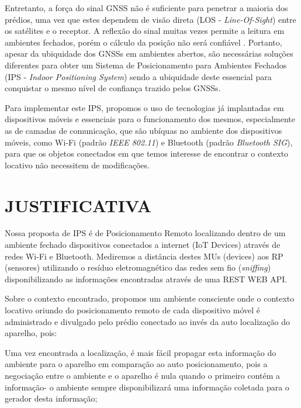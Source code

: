 \documentclass[
	12pt,				%
	openright,			%
	oneside,			%
	a4paper,			%
	chapter=TITLE,		%
	english,			%
	french,				%
	spanish,			%
	brazil				%
	]{abntex2}
\begin{document}
{Entretanto, a força do sinal GNSS não é suficiente para penetrar a maioria dos
prédios, uma vez que estes dependem de visão direta (LOS -
\textit{Line-Of-Sight}) entre os satélites e o receptor. A reflexão do sinal
muitas vezes permite a leitura em ambientes fechados, porém o cálculo da posição
não será confiável \cite{Dartmouth2000}. Portanto, apesar da ubiquidade dos
GNSSs em ambientes abertos, são necessárias soluções diferentes para obter um
Sistema de Posicionamento para Ambientes Fechados (IPS - \textit{Indoor
Positioning System}) sendo a ubiquidade deste essencial para conquistar o mesmo
nível de confiança trazido pelos GNSSs.

Para implementar este IPS, propomos o uso de tecnologias já implantadas em
dispositivos móveis e essenciais para o funcionamento dos mesmos, especialmente
as de camadas de comunicação, que são ubíquas no ambiente dos dispositivos
móveis, como Wi-Fi (padrão \textit{IEEE 802.11}) e Bluetooth (padrão \textit{Bluetooth
SIG}), para que os objetos conectados em que temos interesse de encontrar o
contexto locativo não necessitem de modificações.

\chapter{JUSTIFICATIVA}
\label{chap:JUSTIFICATIVA}

Nossa proposta de IPS é de Posicionamento Remoto localizando dentro de um
ambiente fechado dispositivos conectados a internet (IoT Devices) através de
redes Wi-Fi e Bluetooth. Mediremos a distância destes MUs (devices) aos RP
(sensores) utilizando o resíduo eletromagnético das redes sem fio
(\textit{sniffing}) disponibilizando as informações encontradas através de uma
REST WEB API.

Sobre o contexto encontrado, propomos um ambiente consciente onde o contexto
locativo oriundo do posicionamento remoto de cada dispositivo móvel é
administrado e divulgado pelo prédio conectado ao invés da auto localização do
aparelho, pois:

\begin{alineas}

	\item Uma vez encontrada a localização, é mais fácil propagar esta informação do
ambiente para o aparelho em comparação ao auto posicionamento, pois a negociação
entre o ambiente e o aparelho é nula quando o primeiro contém a informação- o
ambiente sempre disponibilizará uma informação coletada para o gerador desta
informação;


\end{alineas}}
\end{document}
